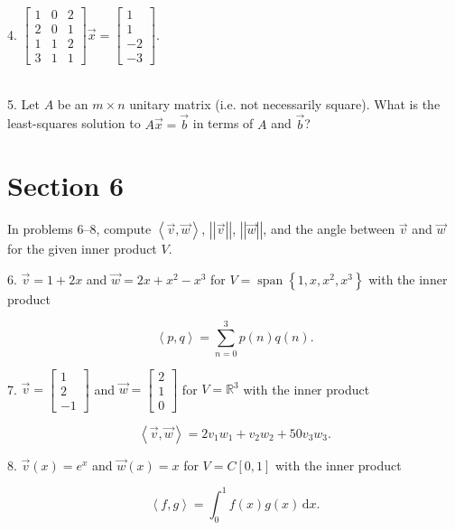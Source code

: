 \documentclass{article}
\begin{document}
4. $\left[\begin{array}{ccc} 1& 0& 2 \\ 2& 0& 1 \\ 1& 1& 2 \\ 3& 1& 1 \end{array}\right]\vec{x} = \left[\begin{array}{c} 1 \\ 1 \\ -2 \\ -3 \end{array}\right]$.

~\\

5. Let $A$ be an $m \times n$ unitary matrix (i.e. not necessarily square). What is the least-squares solution to $A\vec{x} = \vec{b}$ in terms of $A$ and $\vec{b}$?

\section{Section 6}

In problems 6--8, compute $\left< \vec{v}, \vec{w} \right>$, $\left| \left| \vec{v} \right| \right|$, $\left| \left| \vec{w} \right| \right|$, and the angle between $\vec{v}$ and $\vec{w}$ for the given inner product $V$.

6. $\vec{v} = 1 + 2x$ and $\vec{w} = 2x + x^2 - x^3$ for $V = \operatorname{span}\left\{ 1, x, x^2, x^3 \right\}$ with the inner product

$$
	\left< p, q \right> = \sum_{n = 0}^3 p(n)q(n).
$$

7. $\vec{v} = \left[\begin{array}{c} 1 \\ 2 \\ -1 \end{array}\right]$ and $\vec{w} = \left[\begin{array}{c} 2 \\ 1 \\ 0 \end{array}\right]$ for $V = \mathbb{R}^3$ with the inner product

$$
	\left< \vec{v}, \vec{w} \right> = 2v_1w_1 + v_2w_2 + 50v_3w_3.
$$

8. $\vec{v}(x) = e^x$ and $\vec{w}(x) = x$ for $V = C[0, 1]$ with the inner product

$$
	\left< f, g \right> = \int_0^1 f(x)g(x)\,\mathrm{d} x.
$$

~\\
\end{document}
